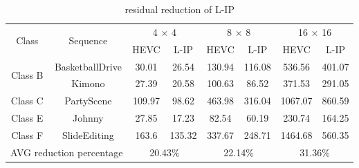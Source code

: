 \documentclass[journal]{IEEEtran}
\begin{document}
\begin{table}[]
    \centering
    \caption{residual reduction of L-IP}
    \label{table: residual reduction}
    \begin{tabular}{c|c|c|c|c|c|c|c}
        \toprule
        \multirow{2}{*}{Class}                          & \multirow{2}{*}{Sequence}    & \multicolumn{2}{c|}{4 × 4}   & \multicolumn{2}{c|}{8 × 8}  & \multicolumn{2}{c}{16 × 16}                             \\ \cline{3-8}
                                                        &                              & HEVC                         & L-IP                         & HEVC                        & L-IP    & HEVC    & L-IP    \\ \hline
        \multirow{2}{*}{Class B}                        & BasketballDrive              & 30.01                        & 26.54                       & 130.94                      & 116.08 & 536.56  & 401.07 \\ \cline{2-8}
                                                        & Kimono                       & 27.39                        & 20.58                       & 100.63                      & 86.52  & 371.53  & 291.05 \\ \hline
        Class C                                         & PartyScene                   & 109.97                       & 98.62                       & 463.98                      & 316.04 & 1067.07 & 860.59 \\  \hline
        Class E                                         & Johnny                       & 27.85                        & 17.23                       & 82.54                       & 60.19  & 230.74  & 164.25 \\ \hline
        Class F                                         & SlideEditing                 & 163.6                        & 135.32                      & 337.67                      & 248.71 & 1464.68 & 560.35 \\ \hline
        \multicolumn{2}{c|}{AVG reduction   percentage} & \multicolumn{2}{c|}{20.43\%} & \multicolumn{2}{c|}{22.14\%} & \multicolumn{2}{c}{31.36\%}                                                           \\ \bottomrule
    \end{tabular}
\end{table}
\end{document}
